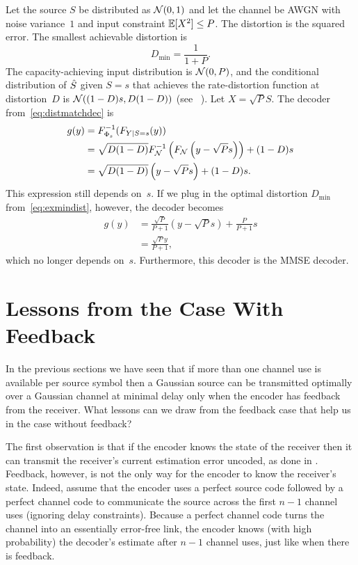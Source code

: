 \begin{example}
  Let the source $S$ be distributed as ${\mathcal{N}}(0,1)$ and let the channel be AWGN
  with noise variance~$1$ and input constraint $\mathbb{E}[X^2] \le P$.
  The distortion is the squared error. The smallest achievable distortion is
  \begin{equation}
    \label{eq:exmindist}
    D_{\min} = \frac{1}{1 + P}.
  \end{equation}
  The capacity-achieving input distribution is ${\mathcal{N}}(0,P)$, and the conditional
  distribution of ${\hat{S}}$ given $S=s$ that achieves the rate-distortion function
  at distortion~$D$ is ${\mathcal{N}}((1-D)s, D(1-D))$ (see \eg~\cite{CoverT1991}).
  Let $X = \sqrt{P}S$.  The decoder from~\eqref{eq:distmatchdec} is
  \begin{align*}
    g(y) &= F_{\Phi_s}^{-1} (F_{Y|S=s}(y)) \\
    &= \sqrt{D(1-D)} F_{{\mathcal{N}}}^{-1} \left( F_{{\mathcal{N}}}\left( y-\sqrt{P}s
    \right) \right) + (1-D)s \\
    &= \sqrt{D(1-D)} \left( y-\sqrt{P}s \right) + (1-D)s.
  \end{align*}
  This expression still depends on~$s$. If we plug in the optimal distortion
  $D_{\min}$ from~\eqref{eq:exmindist}, however, the decoder becomes
  \begin{align*}
    g(y) &= \frac{\sqrt{P}}{P+1} (y - \sqrt{P}s) + \frac{P}{P +
    1}s \\ 
    &= \frac{\sqrt{P}y}{P + 1},
  \end{align*}
  which no longer depends on~$s$. Furthermore, this decoder is the MMSE decoder.
\end{example}


\section{Lessons from the Case With Feedback}\label{sec:lessonsfromfeedback}

In the previous sections we have seen that if more than one channel use is
available per source symbol then a Gaussian source can be transmitted optimally
over a Gaussian channel at minimal delay only when the encoder has feedback from
the receiver.  What lessons can we draw from the feedback case that help us in
the case without feedback?

The first observation is that if the encoder knows the state of the receiver
then it can transmit the receiver's current estimation error uncoded, as done in
. Feedback, however, is not the only way for the encoder to know
the receiver's state. Indeed, assume that the encoder uses a perfect source code
followed by a perfect channel code to communicate the source across the first
$n-1$ channel uses (ignoring delay constraints). Because a perfect channel code
turns the channel into an essentially error-free link, the encoder knows (with
high probability) the decoder's estimate after $n-1$ channel uses, just like
when there is feedback.

